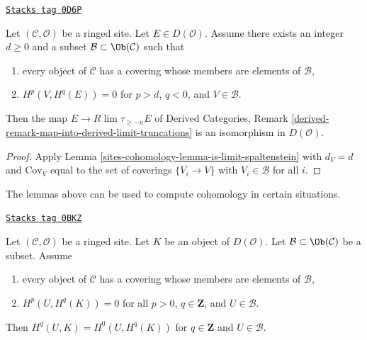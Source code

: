 \begin{lemma}
\label{sites-cohomology-lemma-is-limit-dimension}
\href{https://stacks.math.columbia.edu/tag/0D6P}{\texttt{Stacks tag 0D6P}}

Let $(\mathcal{C}, \mathcal{O})$ be a ringed site. Let $E \in D(\mathcal{O})$.
Assume there exists an integer $d \geq 0$
and a subset $\mathcal{B} \subset \Ob(\mathcal{C})$ such that
\begin{enumerate}
\item every object of $\mathcal{C}$ has a covering whose members are
elements of $\mathcal{B}$,
\item $H^p(V, H^q(E)) = 0$ for $p > d$, $q < 0$, and $V \in \mathcal{B}$.
\end{enumerate}
Then the map $E \to R\lim \tau_{\geq -n} E$ of
Derived Categories, Remark
\ref{derived-remark-map-into-derived-limit-truncations}
is an isomorphism in $D(\mathcal{O})$.
\end{lemma}

\begin{proof}
Apply Lemma \ref{sites-cohomology-lemma-is-limit-spaltenstein}
with $d_V = d$ and $\text{Cov}_V$
equal to the set of coverings $\{V_i \to V\}$ with
$V_i \in \mathcal{B}$ for all $i$.
\end{proof}

The lemmas above can be used to compute cohomology
in certain situations.

\begin{lemma}
\label{sites-cohomology-lemma-cohomology-over-U-trivial}
\href{https://stacks.math.columbia.edu/tag/0BKZ}{\texttt{Stacks tag 0BKZ}}

Let $(\mathcal{C}, \mathcal{O})$ be a ringed site. Let $K$
be an object of $D(\mathcal{O})$.
Let $\mathcal{B} \subset \Ob(\mathcal{C})$ be a subset. Assume
\begin{enumerate}
\item every object of $\mathcal{C}$ has a covering whose members are
elements of $\mathcal{B}$,
\item $H^p(U, H^q(K)) = 0$ for all $p > 0$, $q \in \mathbf{Z}$, and
$U \in \mathcal{B}$.
\end{enumerate}
Then $H^q(U, K) = H^0(U, H^q(K))$ for $q \in \mathbf{Z}$
and $U \in \mathcal{B}$.
\end{lemma}

